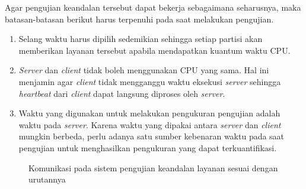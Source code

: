 Agar pengujian keandalan tersebut dapat bekerja sebagaimana seharusnya, maka batasan-batasan
berikut harus terpenuhi pada saat melakukan pengujian.

\begin{enumerate}

	\item Selang waktu harus dipilih sedemikian sehingga setiap partisi akan memberikan
		layanan tersebut apabila mendapatkan kuantum waktu CPU.

	\item \textit{Server} dan \textit{client} tidak boleh menggunakan CPU yang sama. Hal ini
		menjamin agar \textit{client} tidak mengganggu waktu eksekusi \textit{server}
		sehingga \textit{heartbeat} dari \textit{client} dapat langsung diproses oleh
		\textit{server}.
	
	\item Waktu yang digunakan untuk melakukan pengukuran pengujian adalah waktu pada
		\textit{server}. Karena waktu yang dipakai antara \textit{server} dan
		\textit{client} mungkin berbeda, perlu adanya satu sumber kebenaran waktu pada
		saat pengujian untuk menghasilkan pengukuran yang dapat terkuantifikasi.

\end{enumerate}

\begin{figure}[!ht]
	\centering
	\vspace{20pt}
	\caption[Komunikasi pada sistem pengujian keandalan layanan]{Komunikasi pada sistem pengujian keandalan layanan sesuai dengan urutannya}
	\label{figure:server_client_testing_impl}
\end{figure}

